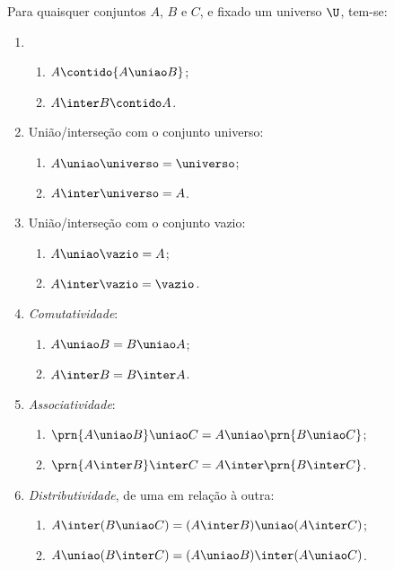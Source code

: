 \begin{proposition}
	\label{prop:uniao-e-intersecao}
	Para quaisquer conjuntos $A$, $B$ e $C$, e fixado um universo $\U$, tem-se:
	\begin{enumerate}
		\item
			\begin{enumerate}
				\label{prop:uniao-e-intersecao-inclusao}
				\item
					$A \contido {A \uniao B}$;
				\item
					${A \inter B} \contido A$.
			\end{enumerate}

		\item
			União/interseção com o conjunto universo:
			\begin{enumerate}
				\item $A \uniao \universo = \universo$;
				\item $A \inter \universo = A$.
			\end{enumerate}
		
		\item
			União/interseção com o conjunto vazio:
			\begin{enumerate}
				\item $A \uniao \vazio = A$;
				\item $A \inter \vazio = \vazio$.
			\end{enumerate}

		\item
			\emph{Comutatividade}:
			\begin{enumerate}
				\item $A \uniao B = B \uniao A$;
				\item $A \inter B = B \inter A$.
			\end{enumerate}

		\item
			\emph{Associatividade}:
			\begin{enumerate}
				\item $\prn{A \uniao B} \uniao C = A \uniao \prn{ B \uniao C}$;
				\item $\prn{A \inter B} \inter C = A \inter \prn{ B \inter C}$.
			\end{enumerate}

		\item
			\emph{Distributividade}, de uma em relação à outra:
			\begin{enumerate}
				\item $A \inter (B \uniao C) = (A \inter B) \uniao (A \inter C)$;
				\item $A \uniao (B \inter C) = (A \uniao B) \inter (A \uniao C)$.
			\end{enumerate}

	\end{enumerate}
\end{proposition}

